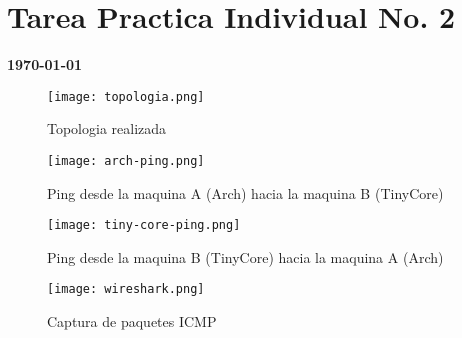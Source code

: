 \documentclass[a4paper,12pt]{article}
\newcommand{\titulo}{Tarea Practica Individual No. 2}
\newcommand*\rbreak{\par\noindent\linebreak}
\begin{document}
\section{\titulo}
\begin{center}
\textbf{\today}
\end{center}
\begin{figure}[h]
	\texttt{[image: topologia.png]}
		 \caption{Topologia realizada}
\end{figure}
\pagebreak
	\begin{figure}[h]
		\texttt{[image: arch-ping.png]}
		 \caption{Ping desde la maquina A (Arch) hacia la maquina B (TinyCore)}
	    \label{fig:conn1}
	    \rbreak
	    \texttt{[image: tiny-core-ping.png]}
		\caption{Ping desde la maquina B (TinyCore) hacia la maquina A (Arch)}
	\end{figure}
\pagebreak
	\begin{figure}[h]
		\texttt{[image: wireshark.png]}
		 \caption{Captura de paquetes ICMP}
	    \label{fig:conn1}
	\end{figure}
\end{document}
